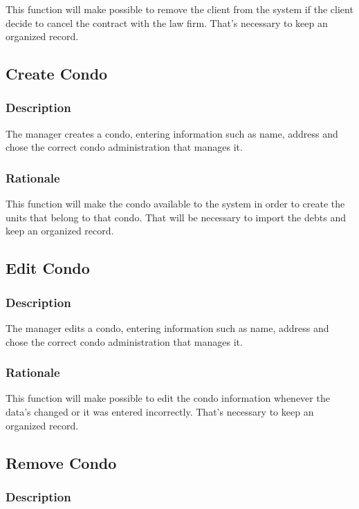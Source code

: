 \documentclass{scrreprt}
\begin{document}
This function will make possible to remove the client from the system if the client decide to cancel the contract with the law firm. That's necessary to keep an organized record.

\subsection{Create Condo}
\subsubsection{Description}

The manager creates a condo, entering information such as name, address and chose the correct condo administration that manages it.

\subsubsection{Rationale}

This function will make the condo available to the system in order to create the units that belong to that condo. That will be necessary to import the debts and keep an organized record.

\subsection{Edit Condo}
\subsubsection{Description}

The manager edits a condo, entering information such as name, address and chose the correct condo administration that manages it.

\subsubsection{Rationale}

This function will make possible to edit the condo information whenever the data's changed or it was entered incorrectly. That's necessary to keep an organized record.

\subsection{Remove Condo}
\subsubsection{Description}
\end{document}
